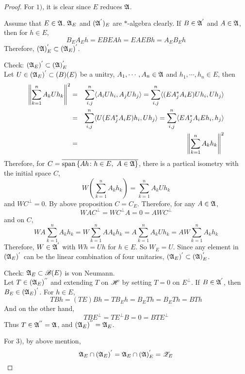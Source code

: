 \documentclass[a4paper,11pt]{report}
\begin{document}
\begin{proof}
	For $1)$, it is clear since $E$ reduces $\mathfrak{A}$. 
	\item Assume that $E \in \mathfrak{A}$. $\mathfrak{A}_E$ and $(\mathfrak{A}^{'})_E$ are $*$-algebra clearly. If $B \in \mathfrak{A}^{'}$ and $A \in \mathfrak{A}$, then for $h \in E$, 
	\begin{equation*}
		B_E A_E h = EBEAh = EAEBh = A_E B_E h
	\end{equation*}
	Therefore, $(\mathfrak{A})^{'}_E \subset (\mathfrak{A}_E)^{'}$.
	\item Check: $(\mathfrak{A}_E)^{'} \subset (\mathfrak{A})^{'}_E$ \\
	Let $U \in (\mathfrak{A}_E)^{'} \subset \mathscr{(}B)(E)$ be a unitry, $A_1,\cdots,A_n \in \mathfrak{A}$ and $h_1,\cdots,h_n \in E$, then
	\begin{eqnarray*}
		\left\lVert\sum_{k=1}^n A_k U h_k\right\lVert^2 &=& \sum_{i,j}^n \langle A_iUh_i,A_jUh_j \rangle = \sum_{i,j}^n \langle (EA_j^{*}A_iE)Uh_i, Uh_j \rangle \\
		&=& \sum_{i,j}^n \langle U(EA_j^{*}A_iE)h_i, Uh_j \rangle = \sum_{i,j}^n \langle EA_j^{*}A_iEh_i, h_j \rangle \\
		&=& \left\lVert\sum_{k=1}^n A_k h_k\right\lVert^2
	\end{eqnarray*}
	Therefore, for $C = \overline{\operatorname{span}{\{Ah \colon h \in E,~ A \in \mathfrak{A}\}}}$, there is a partical isometry with the initial space $C$,
	\begin{equation*}
		W(\sum_{k=1}^n A_k h_k) = \sum_{k=1}^n A_k U h_k
	\end{equation*}
	and $WC^{\bot} = 0$. By above proposition $C = C_E$. Therefore, for any $A \in \mathfrak{A}$,
	\begin{equation*}
		WAC^{\bot} = WC^{\bot}A = 0 = AWC^{\bot}
	\end{equation*}
	and on $C$,
	\begin{equation*}
		WA \sum_{k=1}^n A_k h_k = W \sum_{k=1}^n A A_k h_k = A \sum_{k=1}^n A_kUh_k = AW\sum_{k=1}^n A_k h_k
	\end{equation*}
	Therefore, $W \in \mathfrak{A}^{'}$ with $Wh = Uh$ for $h \in E$. So $W_E = U$. Since any element in $(\mathfrak{A}_E)^{'}$ can be the linear combination of four unitaries, $(\mathfrak{A}_E)^{'} \subset (\mathfrak{A})^{'}_E$.
	\item Check: $\mathfrak{A}_E \subset \mathscr{B}(E)$ is von Neumann. \\
	Let $T \in (\mathfrak{A}_E)^{''}$ and extending $T$ on $\mathscr{H}$ by setting $T = 0$ on $E^{\bot}$. If $B \in \mathfrak{A}^{'}$, then $B_E \in (\mathfrak{A}_E)^{'}$. For $h \in E$,
	\begin{equation*}
		TBh = (TE)Bh = T B_E h = B_E Th = B_E Th =B Th
	\end{equation*}
	And on the other hand,
	\begin{equation*}
		TBE^{\bot} = TE^{\bot}B = 0 = BTE^{\bot}
	\end{equation*}
	Thus $T \in \mathfrak{A}^{''} = \mathfrak{A}$, and $(\mathfrak{A}_E)^{''} = \mathfrak{A}_E$.
	\item For $3)$, by above mention, 
	\begin{equation*}
		\mathfrak{A}_E \cap (\mathfrak{A}_E)^{'} = \mathfrak{A}_E \cap (\mathfrak{A})^{'}_E = \mathscr{Z}_E \qedhere
	\end{equation*}
\end{proof}
\end{document}
